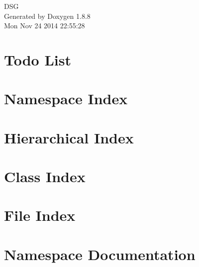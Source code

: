 \documentclass[twoside]{book}
\newcommand{\+}{\discretionary{\mbox{\scriptsize$\hookleftarrow$}}{}{}}
\newcommand{\clearemptydoublepage}{%
  \newpage{\pagestyle{empty}\cleardoublepage}%
}
\begin{document}
\hypersetup{pageanchor=false,
             bookmarks=true,
             bookmarksnumbered=true,
             pdfencoding=unicode
            }
\begin{titlepage}
\vspace*{7cm}
\begin{center}%
{\Large D\+S\+G }\\
\vspace*{1cm}
{\large Generated by Doxygen 1.8.8}\\
\vspace*{0.5cm}
{\small Mon Nov 24 2014 22:55:28}\\
\end{center}
\end{titlepage}
\clearemptydoublepage
\tableofcontents
\clearemptydoublepage
{}
\hypersetup{pageanchor=true}

\chapter{Todo List}
\label{todo}
\hypertarget{todo}{}

\chapter{Namespace Index}

\chapter{Hierarchical Index}

\chapter{Class Index}

\chapter{File Index}

\chapter{Namespace Documentation}









\end{document}
